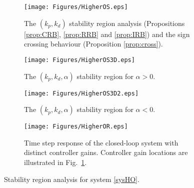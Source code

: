 \documentclass[twoside,reqno,11pt]{fcaa-var} %
\begin{document}
\begin{figure}%
	\centering %
	\begin{subfigure}[b]{0.48\columnwidth}
		\centering
		\texttt{[image: Figures/HigherOS.eps]}
		\caption{The $(k_p,k_d)$ stability region analysis (Propositions \ref{prop:CRB}, \ref{prop:RRB} and \ref{prop:IRB}) and  the sign crossing behaviour (Proposition \ref{prop:cross}).}
		\label{HOstabilitya}
	\end{subfigure}
	\hfill
	\begin{subfigure}[b]{0.48\columnwidth}
		\centering
		\texttt{[image: Figures/HigherOS3D.eps]}
		\caption{The $(k_p,k_d,\alpha)$ stability region for $\alpha>0$.}
		\label{HOstabilityb}
	\end{subfigure}
	\hfill
	\begin{subfigure}[b]{0.48\columnwidth}
		\centering
		\texttt{[image: Figures/HigherOS3D2.eps]}
		\caption{The $(k_p,k_d,\alpha)$ stability region for $\alpha<0$.}
		\label{HOstabilityc}
	\end{subfigure}
	\hfill
	\begin{subfigure}[b]{0.48\columnwidth}
		\centering
		\texttt{[image: Figures/HigherOR.eps]}
		\caption{Time step response of the closed-loop system with distinct controller gains. Controller gain locations are illustrated in Fig.~\ref{HOstabilitya}.}\label{HOResponse}
	\end{subfigure}
	\caption{Stability region analysis for system \eqref{sysHO}.}\label{HOstability}
\end{figure}
\end{document}
